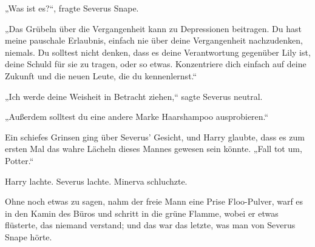 „Was ist es?“, fragte Severus Snape.

„Das Grübeln über die Vergangenheit kann zu Depressionen beitragen. Du hast meine pauschale Erlaubnis, einfach nie über deine Vergangenheit nachzudenken, niemals. Du solltest nicht denken, dass es deine Verantwortung gegenüber Lily ist, deine Schuld für sie zu tragen, oder so etwas. Konzentriere dich einfach auf deine Zukunft und die neuen Leute, die du kennenlernst.“

„Ich werde deine Weisheit in Betracht ziehen,“ sagte Severus neutral.

„Außerdem solltest du eine andere Marke Haarshampoo ausprobieren.“

Ein schiefes Grinsen ging über Severus' Gesicht, und Harry glaubte, dass es zum ersten Mal das wahre Lächeln dieses Mannes gewesen sein könnte.
„Fall tot um, Potter.“

Harry lachte. Severus lachte. Minerva schluchzte.

Ohne noch etwas zu sagen, nahm der freie Mann eine Prise Floo-Pulver, warf es in den Kamin des Büros und schritt in die grüne Flamme, wobei er etwas flüsterte, das niemand verstand; und das war das letzte, was man von Severus Snape hörte.

